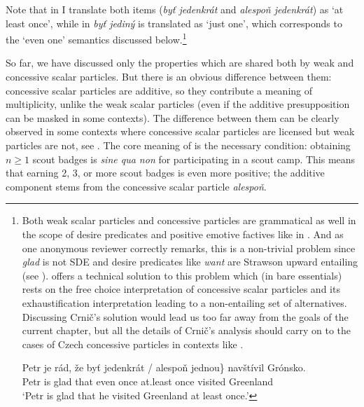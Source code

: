 \documentclass[output=paper,colorlinks,citecolor=brown]{langscibook}
\begin{document}
Note that in  I translate both items (\textit{byť jedenkrát} and \textit{alespoň jedenkrát}) as ‘at least once’, while in  \textit{byť jediný} is translated as ‘just one’, which corresponds to the ‘even one’ semantics discussed below.\footnote{Both weak scalar particles and concessive particles are grammatical as well in the scope of desire predicates and positive emotive factives like in . And as one anonymous reviewer correctly remarks, this is a non-trivial problem since \textit{glad} is not SDE  and desire predicates like \textit{want} are Strawson upward entailing (see \citealt{von1999npi}). \citet[section 4.2.5]{Crnic2011} offers a technical solution to this problem which (in bare essentials) rests on the free choice interpretation of concessive scalar particles and its exhaustification interpretation leading to a non-entailing set of alternatives. Discussing Crnič's solution would lead us too far away from the goals of the current chapter, but all the details of Crnič's analysis should carry on to the cases of Czech concessive particles in contexts like . 


\ea\label{ex:60-b} \gll Petr je rád, že \minsp{\{} byť jedenkrát / alespoň jednou\} navštívil Grónsko.\\
Petr is glad that {} even once {} at.least once visited Greenland\\
\glt `Petr is glad that he visited Greenland at least once.'
\z

}

\ea\label{ex:60}
\z
\z

\noindent So far, we have discussed only the properties which are shared both by weak and concessive scalar particles. But there is an obvious difference between them: concessive scalar particles are additive, so they contribute a meaning of multiplicity, unlike the weak scalar particles (even if the additive presupposition can be masked in some contexts). The difference between them can be clearly observed in some contexts where concessive scalar particles are licensed but weak particles are not, see . The core meaning of  is the necessary condition: obtaining \(n \geq 1\) scout badges is \textit{sine qua non} for participating in a scout camp. This means that earning 2, 3, or more scout badges is even more positive; the additive component stems from the concessive scalar particle \emph{alespoň}.
\end{document}
